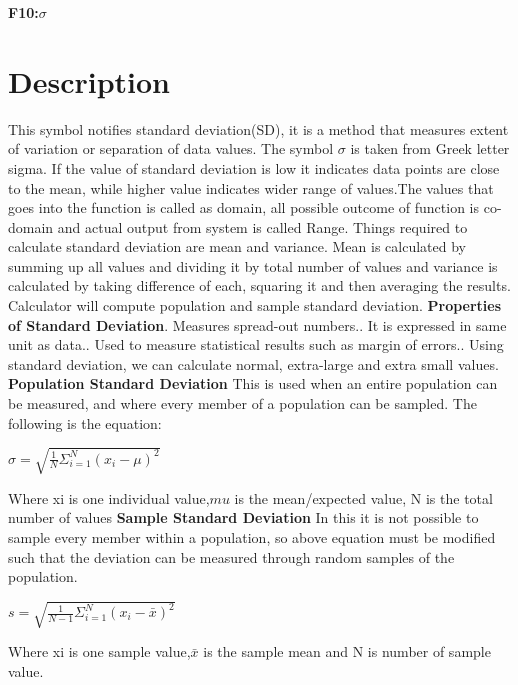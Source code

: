 \documentclass{article}
\begin{document}
\begin{titlepage}
    \begin{center}
        \large\textbf{F10:$\sigma$}
    \end{center}
  
    
\section{Description}
This symbol notifies standard deviation(SD), it is a method that measures extent of variation or separation of data values. The symbol $\sigma$  is taken from Greek letter sigma. If the value of standard deviation is low it indicates data points are close to the mean, while higher value indicates wider range of values.The values that goes into the function is called as domain, all possible outcome of function is co-domain and actual output from system is called Range. Things required to calculate standard deviation are mean and variance. Mean is calculated by summing up all values and dividing it by total number of values and variance is calculated by taking difference of each, squaring it and then averaging the results. Calculator will compute population and sample standard deviation.\newline
\textbf{Properties of Standard Deviation}.	Measures spread-out numbers..	It is expressed in same unit as data..	Used to measure statistical results such as margin of errors..	Using standard deviation, we can calculate normal, extra-large and extra small values.
\newline
\newline
\textbf{Population Standard Deviation}
\newline
This is used when an entire population can be measured, and where every member of a population can be sampled. The following is the equation:
\begin{center}
\begin{math}
\sigma=\sqrt{\frac{1}{N}\Sigma_{i=1}^{N}(x_{i}-\mu)^2}
\end{math}
\end{center}
Where xi is one individual value,$mu$ is the mean/expected value, N is the total number of values
\newline
\newline
\textbf{Sample Standard Deviation}
\newline
In this it is not possible to sample every member within a population, so above equation must be modified such that the deviation can be measured through random samples of the population. 
\begin{center}
\begin{math}
s= \sqrt{\frac{1}{N-1}\Sigma_{i=1}^{N}(x_{i}-\bar{x})^2}
\end{math}
\end{center}
Where xi is one sample value,$\bar{x}$ is the sample mean and N is number of sample value.


\end{titlepage}
\end{document}
